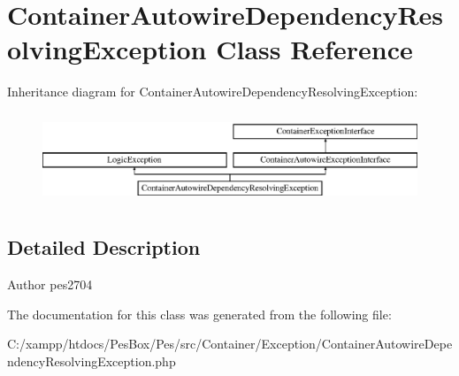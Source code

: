 \hypertarget{class_pes_1_1_container_1_1_exception_1_1_container_autowire_dependency_resolving_exception}{}\section{Container\+Autowire\+Dependency\+Resolving\+Exception Class Reference}
\label{class_pes_1_1_container_1_1_exception_1_1_container_autowire_dependency_resolving_exception}
Inheritance diagram for Container\+Autowire\+Dependency\+Resolving\+Exception\+:\begin{figure}[H]
\begin{center}
\leavevmode
\includegraphics[height=2.736156cm]{class_pes_1_1_container_1_1_exception_1_1_container_autowire_dependency_resolving_exception}
\end{center}
\end{figure}


\subsection{Detailed Description}
\begin{DoxyAuthor}{Author}
pes2704 
\end{DoxyAuthor}


The documentation for this class was generated from the following file\+:\begin{DoxyCompactItemize}
\item 
C\+:/xampp/htdocs/\+Pes\+Box/\+Pes/src/\+Container/\+Exception/Container\+Autowire\+Dependency\+Resolving\+Exception.\+php\end{DoxyCompactItemize}
